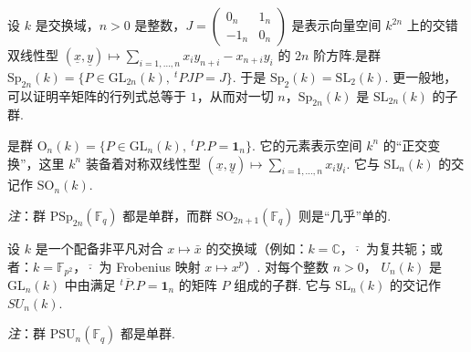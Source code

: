 \begin{numpara}[辛群与正交群]\label{np:fg-2-4-3}
设 $k$ 是交换域，$n>0$ 是整数，$J=\begin{pmatrix}0_n & 1_n\\ -1_n & 0_n\end{pmatrix}$ 是表示向量空间 $k^{2n}$ 上的交错双线性型 $(\underline{x},\underline{y})\mapsto\sum_{i=1,\ldots,n}x_iy_{n+i}-x_{n+i}y_i$ 的 $2n$ 阶方阵.是群 $\mathrm{Sp}_{2n}(k)=\{P\in\mathrm{GL}_{2n}(k),\ {}^tPJP=J\}$. 于是 $\mathrm{Sp}_2(k)=\mathrm{SL}_2(k)$. 更一般地，可以证明辛矩阵的行列式总等于 $1$，从而对一切 $n$，$\mathrm{Sp}_{2n}(k)$ 是 $\mathrm{SL}_{2n}(k)$ 的子群.

是群 $\mathrm{O}_n(k)=\{P\in\mathrm{GL}_n(k),\ {}^tP.P=\mathbf{1}_n\}$. 它的元素表示空间 $k^n$ 的``正交变换''，这里 $k^n$ 装备着对称双线性型 $(\underline{x},\underline{y})\mapsto\sum_{i=1,\ldots,n}x_iy_i$. 它与 $\mathrm{SL}_n(k)$ 的交记作 $\mathrm{SO}_n(k)$.

\emph{注}：群 $\mathrm{PSp}_{2n}(\mathbb{F}_q)$ 都是单群，而群 $\mathrm{SO}_{2n+1}(\mathbb{F}_q)$ 则是``几乎''单的.
\end{numpara}
\begin{numpara}[酉群]\label{np:fg-2-4-4}
设 $k$ 是一个配备非平凡对合 $x\mapsto\bar{x}$ 的交换域（例如：$k=\mathbb{C}$，$\overline{\cdot}$ 为复共轭；或者：$k=\mathbb{F}_{p^2}$，$\overline{\cdot}$ 为 Frobenius 映射 $x\mapsto x^p$）. 对每个整数 $n>0$， $U_n(k)$ 是 $\mathrm{GL}_n(k)$ 中由满足 ${}^t\overline{P}.P=\mathbf{1}_n$ 的矩阵 $P$ 组成的子群. 它与 $\mathrm{SL}_n(k)$ 的交记作 $SU_n(k)$.

\emph{注}：群 $\mathrm{PSU}_n(\mathbb{F}_q)$ 都是单群.
\end{numpara}
